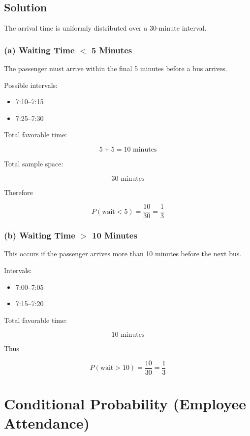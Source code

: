\documentclass[12pt]{article}
\begin{document}
\subsection*{Solution}

The arrival time is uniformly distributed over a 30-minute interval.

\subsubsection*{(a) Waiting Time $<$ 5 Minutes}

The passenger must arrive within the final 5 minutes before a bus arrives.

Possible intervals:

\begin{itemize}
\item 7:10--7:15
\item 7:25--7:30
\end{itemize}

Total favorable time:

\[
5 + 5 = 10 \text{ minutes}
\]

Total sample space:

\[
30 \text{ minutes}
\]

Therefore

\[
P(\text{wait} < 5) = \frac{10}{30} = \frac{1}{3}
\]

\subsubsection*{(b) Waiting Time $>$ 10 Minutes}

This occurs if the passenger arrives more than 10 minutes before the next bus.

Intervals:

\begin{itemize}
\item 7:00--7:05
\item 7:15--7:20
\end{itemize}

Total favorable time:

\[
10 \text{ minutes}
\]

Thus

\[
P(\text{wait} > 10) = \frac{10}{30} = \frac{1}{3}
\]

\section{Conditional Probability (Employee Attendance)}
\end{document}
